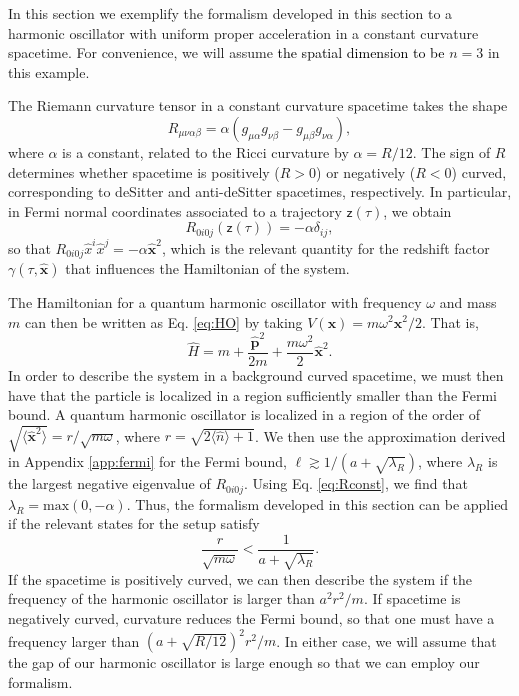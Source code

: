 \documentclass[prd,twocolumn,superscriptaddress,floatfix,amsmath,amssymb,amsfonts,longbibliography,nofootinbib]{revtex4-1}
\newcommand{\mf}{\mathsf}%
\newcommand{\tb}[1]{\textcolor{black}{#1}}
\begin{document}
In this section we exemplify the formalism developed in this section to a harmonic oscillator with uniform proper acceleration in a constant curvature spacetime. For convenience, we will assume \tb{the spatial dimension to be} $n=3$ in this example.

The Riemann curvature tensor in a constant curvature spacetime takes the shape
\begin{equation}
    R_{\mu\nu\alpha\beta} = \alpha (g_{\mu\alpha}g_{\nu \beta} - g_{\mu\beta}g_{\nu\alpha}),
\end{equation}
where $\alpha$ is a constant, related to the Ricci curvature by $\alpha = R/12$. The sign of $R$ determines whether spacetime is positively ($R>0$) or negatively ($R<0$) curved, corresponding to deSitter and anti-deSitter spacetimes, respectively. In particular, in Fermi normal coordinates associated to a trajectory $\mf{z}(\tau)$, we obtain
\begin{equation}\label{eq:Rconst}
    R_{0i0j}(\mf z(\tau)) = -\alpha\delta_{ij},
\end{equation}
so that $R_{0i0j}\hat{x}^i \hat{x}^j = -\alpha \hat{\bm x}^2$, which is the relevant quantity for the redshift factor $\gamma(\tau,\hat{\bm x})$ that influences the Hamiltonian of the system.

The Hamiltonian for a quantum harmonic oscillator with frequency $\omega$ and mass $m$ can then be written as Eq. \eqref{eq:HO} by taking $V(\bm x) = m \omega^2 \bm x^2/2$. That is,
\begin{equation}
    \hat{H} = m + \frac{\hat{\bm p}^2}{2m} + \frac{m \omega^2}{2}\hat{\bm x}^2.
\end{equation}
In order to describe the system in a background curved spacetime, we must then have that the particle is localized in a region sufficiently smaller than the Fermi bound. A quantum harmonic oscillator is localized in a region of the order of $\sqrt{\langle\hat{\bm x}^2\rangle}=r/\sqrt{m\omega}$, where $r=\sqrt{2\langle\hat{n}\rangle+1}$. We then use the approximation derived in Appendix \ref{app:fermi} for the Fermi bound, $\ell \gtrsim 1/(a+\sqrt{\lambda_R})$, where $\lambda_R$ is the largest negative eigenvalue of $R_{0i0j}$. Using Eq. \eqref{eq:Rconst}, we find that $\lambda_R = \text{max}(0,-\alpha)$. Thus, the formalism developed in this section can be applied if the relevant states for the setup satisfy
\begin{equation}
    \frac{r}{\sqrt{m \omega}}<\frac{1}{a + \sqrt{\lambda_R}}.
\end{equation}
If the spacetime is positively curved, we can then describe the system if the frequency of the harmonic oscillator is larger than $a^2r^2/m$. If spacetime is negatively curved, curvature reduces the Fermi bound, so that one must have a frequency larger than $(a+ \sqrt{R/12})^2r^2/m$. In either case, we will assume that the gap of our harmonic oscillator is large enough so that we can employ our formalism.
\end{document}
